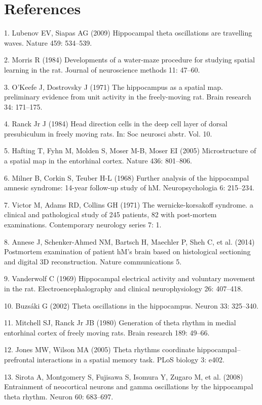 \documentclass[]{article}
\let\stdsection\section
\renewcommand\section{\newpage\stdsection}
\begin{document}
\section*{References}

1. Lubenov EV, Siapas AG (2009) Hippocampal theta oscillations are
travelling waves. Nature 459: 534--539.

2. Morris R (1984) Developments of a water-maze procedure for studying
spatial learning in the rat. Journal of neuroscience methods 11: 47--60.

3. O'Keefe J, Dostrovsky J (1971) The hippocampus as a spatial map.
preliminary evidence from unit activity in the freely-moving rat. Brain
research 34: 171--175.

4. Ranck Jr J (1984) Head direction cells in the deep cell layer of
dorsal presubiculum in freely moving rats. In: Soc neurosci abstr. Vol.
10.

5. Hafting T, Fyhn M, Molden S, Moser M-B, Moser EI (2005)
Microstructure of a spatial map in the entorhinal cortex. Nature 436:
801--806.

6. Milner B, Corkin S, Teuber H-L (1968) Further analysis of the
hippocampal amnesic syndrome: 14-year follow-up study of hM.
Neuropsychologia 6: 215--234.

7. Victor M, Adams RD, Collins GH (1971) The wernicke-korsakoff
syndrome. a clinical and pathological study of 245 patients, 82 with
post-mortem examinations. Contemporary neurology series 7: 1.

8. Annese J, Schenker-Ahmed NM, Bartsch H, Maechler P, Sheh C, et al.
(2014) Postmortem examination of patient hM's brain based on
histological sectioning and digital 3D reconstruction. Nature
communications 5.

9. Vanderwolf C (1969) Hippocampal electrical activity and voluntary
movement in the rat. Electroencephalography and clinical neurophysiology
26: 407--418.

10. Buzs{á}ki G (2002) Theta oscillations in the hippocampus. Neuron 33:
325--340.

11. Mitchell SJ, Ranck Jr JB (1980) Generation of theta rhythm in medial
entorhinal cortex of freely moving rats. Brain research 189: 49--66.

12. Jones MW, Wilson MA (2005) Theta rhythms coordinate
hippocampal--prefrontal interactions in a spatial memory task. PLoS
biology 3: e402.

13. Sirota A, Montgomery S, Fujisawa S, Isomura Y, Zugaro M, et al.
(2008) Entrainment of neocortical neurons and gamma oscillations by the
hippocampal theta rhythm. Neuron 60: 683--697.
\end{document}
